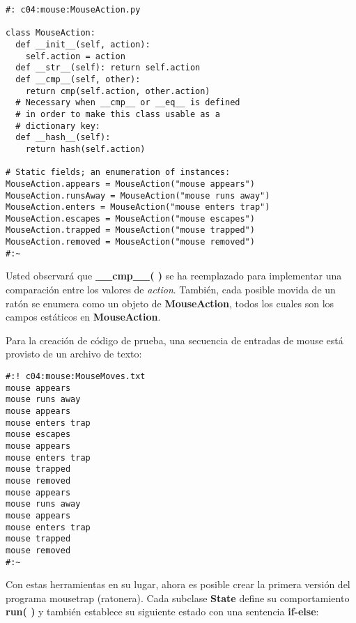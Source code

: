 \begin{lstlisting}
#: c04:mouse:MouseAction.py 

class MouseAction: 
  def __init__(self, action):  
    self.action = action 
  def __str__(self): return self.action  
  def __cmp__(self, other): 
    return cmp(self.action, other.action) 
  # Necessary when __cmp__ or __eq__ is defined 
  # in order to make this class usable as a 
  # dictionary key: 
  def __hash__(self):  
    return hash(self.action) 
    
# Static fields; an enumeration of instances: 
MouseAction.appears = MouseAction("mouse appears") 
MouseAction.runsAway = MouseAction("mouse runs away") 
MouseAction.enters = MouseAction("mouse enters trap") 
MouseAction.escapes = MouseAction("mouse escapes") 
MouseAction.trapped = MouseAction("mouse trapped") 
MouseAction.removed = MouseAction("mouse removed") 
#:~   
  \end{lstlisting}
  
Usted observará que \textbf{\_\_cmp\_\_( )} se ha reemplazado para implementar una comparación entre los valores de \textit{action}. También, cada posible movida de un ratón se enumera como un objeto de \textbf{MouseAction}, todos los cuales son los campos estáticos en \textbf{MouseAction}. \newline

Para la creación de código de prueba, una secuencia de entradas de mouse está provisto de un archivo de texto:  \newline
  
\begin{lstlisting}  
#:! c04:mouse:MouseMoves.txt 
mouse appears 
mouse runs away 
mouse appears 
mouse enters trap 
mouse escapes 
mouse appears 
mouse enters trap 
mouse trapped 
mouse removed 
mouse appears 
mouse runs away 
mouse appears 
mouse enters trap 
mouse trapped 
mouse removed 
#:~ 
\end{lstlisting}
 
 Con estas herramientas en su lugar, ahora es posible crear la primera versión del programa mousetrap (ratonera). Cada subclase \textbf{State} define su comportamiento \textbf{run( )} y también establece su siguiente estado con una sentencia \textbf{if-else}:   \newline
   
